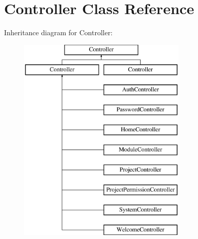 \section{Controller Class Reference}
\label{class_illuminate_1_1_routing_1_1_controller}
Inheritance diagram for Controller\+:\begin{figure}[H]
\begin{center}
\leavevmode
\includegraphics[height=10.000000cm]{class_illuminate_1_1_routing_1_1_controller}
\end{center}
\end{figure}
